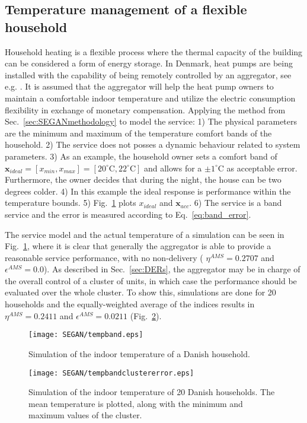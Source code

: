\subsection{Temperature management of a flexible household}
Household heating is a flexible process where the thermal capacity of the building can be considered a form of energy storage. In Denmark, heat pumps are being installed with the capability of being remotely controlled by an aggregator, see e.g. \cite{insero}. It is assumed that the aggregator will help the heat pump owners to maintain a comfortable indoor temperature and utilize the electric consumption flexibility in exchange of monetary compensation.
\newpage
Applying the method from Sec.~\ref{sec:SEGANmethodology} to model the service: 1) The physical parameters are the minimum and maximum of the temperature comfort bands of the household. 2) The service does not posses a dynamic behaviour related to system parameters. 3) As an example, the household owner sets a comfort band of $\mathbf{x}_{ideal} = [x_{min},x_{max}] = [20 ^{\circ}\text{C},22^{\circ}\text{C}]$ and allows for a $\pm 1 ^{\circ}\text{C}$ as acceptable error. Furthermore, the owner decides that during the night, the house can be two degrees colder. 4) In this example the ideal response is performance within the temperature bounds. 5) Fig.~\ref{fig:tempband} plots $x_{ideal}$ and $\mathbf{x}_{acc}$. 6) The service is a band service and the error is measured according to Eq.~\eqref{eq:band_error}.

The service model and the actual temperature of a simulation can be seen in Fig.~\ref{fig:tempband}, where it is clear that generally the aggregator is able to provide a reasonable service performance, with no non-delivery ( $\eta^{AMS} = 0.2707$ and $\epsilon^{AMS} = 0.0$). As described in Sec.~\ref{sec:DERs}, the aggregator may be in charge of the overall control of a cluster of units, in which case the performance should be evaluated over the whole cluster. To show this, simulations are done for 20 households and the equally-weighted average of the indices results in $\eta^{AMS} = 0.2411$ and $\epsilon^{AMS} = 0.0211$ (Fig.~\ref{fig:tempbandclustererror}).

\begin{figure}
\centering
\texttt{[image: SEGAN/tempband.eps]}
\caption{Simulation of the indoor temperature of a Danish household.}
\label{fig:tempband}
\end{figure}

\begin{figure}
\centering
\texttt{[image: SEGAN/tempbandclustererror.eps]}
\caption{Simulation of the indoor temperature of 20 Danish households. The mean temperature is plotted, along with the minimum and maximum values of the cluster.}
\label{fig:tempbandclustererror}
\end{figure}
